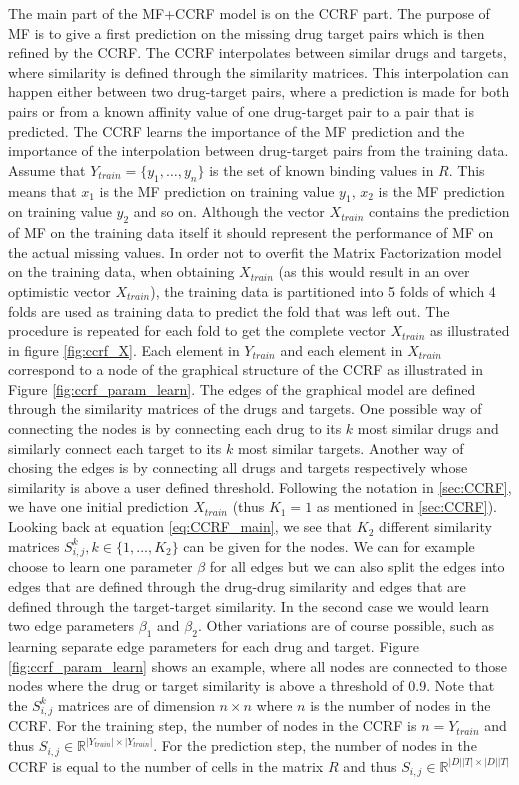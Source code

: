 The main part of the MF+CCRF model is on the CCRF part. The purpose of MF is to give a first prediction on the missing drug target pairs which is then refined by the CCRF. The CCRF interpolates between similar drugs and targets, where similarity is defined through the similarity matrices. This interpolation can happen either between two drug-target pairs, where a prediction is made for both pairs or from a known affinity value of one drug-target pair to a pair that is predicted. The CCRF learns the importance of the MF prediction and the importance of the interpolation between drug-target pairs from the training data.
Assume that $Y_{train} = \{y_1, \dots, y_n\}$ is the set of known binding values in $R$. This means that $x_1$ is the MF prediction on training value $y_1$, $x_2$ is the MF prediction on training value $y_2$ and so on. Although the vector $X_{train}$ contains the prediction of MF on the training data itself it should represent the performance of MF on the actual missing values. In order not to overfit the Matrix Factorization model on the training data, when obtaining $X_{train}$ (as this would result in an over optimistic vector $X_{train}$), the training data is partitioned into 5 folds of which 4 folds are used as training data to predict the fold that was left out. The procedure is repeated for each fold to get the complete vector $X_{train}$ as illustrated in figure \ref{fig:ccrf_X}. Each element in $Y_{train}$ and each element in $X_{train}$ correspond to a node of the graphical structure of the CCRF as illustrated in Figure \ref{fig:ccrf_param_learn}. The edges of the graphical model are defined through the similarity matrices of the drugs and targets. One possible way of connecting the nodes is by connecting each drug to its $k$ most similar drugs and similarly connect each target to its $k$ most similar targets. Another way of chosing the edges is by connecting all drugs and targets respectively whose similarity is above a user defined threshold. Following the notation in \ref{sec:CCRF}, we have one initial prediction $X_{train}$ (thus $K_1=1$ as mentioned in \ref{sec:CCRF}). Looking back at equation \ref{eq:CCRF_main}, we see that $K_2$ different similarity matrices $S_{i,j}^k, k \in \{1,\dots,K_2\}$ can be given for the nodes. We can for example choose to learn one parameter $\beta$ for all edges but we can also split the edges into edges that are defined through the drug-drug similarity and edges that are defined through the target-target similarity. In the second case we would learn two edge parameters $\beta_1$ and $\beta_2$. Other variations are of course possible, such as learning separate edge parameters for each drug and target. Figure \ref{fig:ccrf_param_learn} shows an example, where all nodes are connected to those nodes where the drug or target similarity is above a threshold of 0.9. Note that the $S_{i,j}^k$ matrices are of dimension $n \times n$ where $n$ is the number of nodes in the CCRF. For the training step, the number of nodes in the CCRF is $n = Y_{train}$
 and thus $S_{i,j} \in \mathbb{R}^{|Y_{train}| \times |Y_{train}|}$. For the prediction step, the number of nodes in the CCRF is equal to the number of cells in the matrix $R$ and thus $S_{i,j} \in \mathbb{R}^{|D||T| \times |D||T|}$

